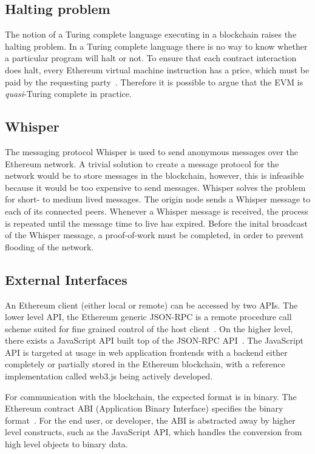 \subsection{Halting problem}
The notion of a Turing complete language executing in a blockchain raises the halting problem. In a Turing complete language there is no way to know whether a particular program will halt or not. To ensure that each contract interaction does halt, every Ethereum virtual machine instruction has a price, which must be paid by the requesting party~\cite{ethereum:yellow}. Therefore it is possible to argue that the EVM is \emph{quasi}-Turing complete in practice.

\subsection{Whisper}
The messaging protocol Whisper is used to send anonymous messages over the Ethereum network. A trivial solution to create a message protocol for the network would be to store messages in the blockchain, however, this is infeasible because it would be too expensive to send messages. Whisper solves the problem for short- to medium lived messages. The origin node sends a Whisper message to each of its connected peers. Whenever a Whisper message is received, the process is repeated until the message time to live has expired. Before the inital broadcast of the Whisper message, a proof-of-work must be completed, in order to prevent flooding of the network.

\subsection{External Interfaces}
An Ethereum client (either local or remote) can be accessed by two APIs. The lower level API, the Ethereum generic JSON-RPC is a remote procedure call scheme suited for fine grained control of the host client~\cite{generic-json-rpc}. On the higher level, there exists a JavaScript API built top of the JSON-RPC API~\cite{javascript-api}. The JavaScript API is targeted at usage in web application frontends with a backend either completely or partially stored in the Ethereum blockchain, with a reference implementation called web3.js being actively developed.

For communication with the blockchain, the expected format is in binary. The Ethereum contract ABI (Application Binary Interface) specifies the binary format~\cite{ethereum-contract-abi}. For the end user, or developer, the ABI is abstracted away by higher level constructs, such as the JavaScript API, which handles the conversion from high level objects to binary data.


